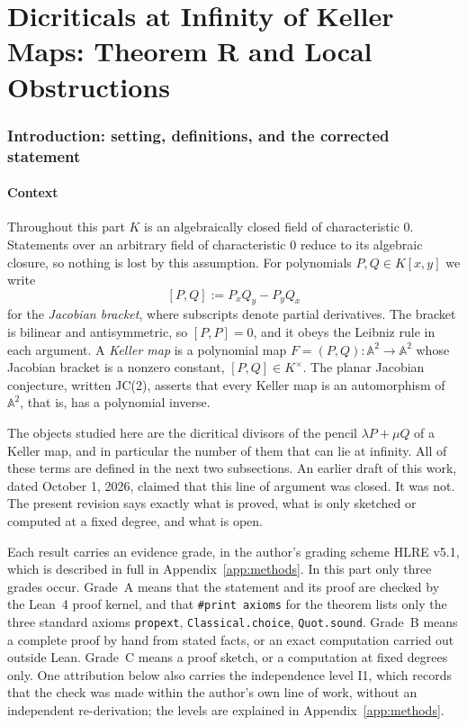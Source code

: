 \documentclass[a4paper,11pt]{article}
\theoremstyle{jsplain}
\theoremstyle{jsdef}
\theoremstyle{jsrem}
\begin{document}
\part{\texorpdfstring{Dicriticals at Infinity of Keller Maps: Theorem R and Local Obstructions}{Dicriticals at Infinity of Keller Maps: Theorem R and Local Obstructions}}

\section{Introduction: setting, definitions, and the corrected statement}\label{td:sec:statement}

\subsection{Context}

Throughout this part $K$ is an algebraically closed field of characteristic $0$. Statements
over an arbitrary field of characteristic $0$ reduce to its algebraic closure, so nothing is
lost by this assumption. For polynomials $P, Q \in K[x,y]$ we write
\[
[P,Q] := P_x Q_y - P_y Q_x
\]
for the \emph{Jacobian bracket}, where subscripts denote partial derivatives. The bracket is
bilinear and antisymmetric, so $[P,P] = 0$, and it obeys the Leibniz rule in each argument. A
\emph{Keller map} is a polynomial map $F = (P,Q) \colon \mathbb{A}^2 \to \mathbb{A}^2$ whose
Jacobian bracket is a nonzero constant, $[P,Q] \in K^\times$. The planar Jacobian conjecture,
written JC(2), asserts that every Keller map is an automorphism of $\mathbb{A}^2$, that is,
has a polynomial inverse.

The objects studied here are the dicritical divisors of the pencil $\lambda P + \mu Q$ of a
Keller map, and in particular the number of them that can lie at infinity. All of these terms
are defined in the next two subsections. An earlier draft
of this work, dated October 1, 2026, claimed that this line of argument was closed. It was
not. The present revision says exactly what is proved, what is only sketched or computed at a
fixed degree, and what is open.

Each result carries an evidence grade, in the author's grading scheme HLRE v5.1, which is
described in full in Appendix~\ref{app:methods}. In this part only three grades occur. Grade~A
means that the statement and its proof are checked by the Lean~4 proof kernel, and that
\texttt{\#print axioms} for the theorem lists only the three standard axioms
\texttt{propext}, \texttt{Classical.\allowbreak{}choice}, \texttt{Quot.\allowbreak{}sound}. Grade~B means a complete
proof by hand from stated facts, or an exact computation carried out outside Lean. Grade~C
means a proof sketch, or a computation at fixed degrees only. One attribution below also
carries the independence level I1, which records that the check was made within the author's
own line of work, without an independent re-derivation; the levels are explained in
Appendix~\ref{app:methods}.
\end{document}
